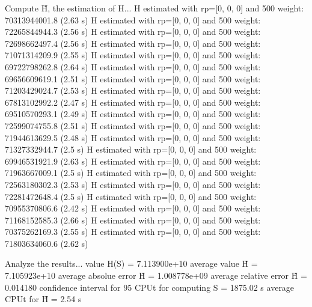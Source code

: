 Compute H̃, the estimation of H...
  H estimated with rp=[0, 0, 0] and 500 weight:  70313944001.8  (2.63 s)
  H estimated with rp=[0, 0, 0] and 500 weight:  72265844944.3  (2.56 s)
  H estimated with rp=[0, 0, 0] and 500 weight:  72698662497.4  (2.56 s)
  H estimated with rp=[0, 0, 0] and 500 weight:  71071314209.9  (2.55 s)
  H estimated with rp=[0, 0, 0] and 500 weight:  69722798262.8  (2.64 s)
  H estimated with rp=[0, 0, 0] and 500 weight:  69656609619.1  (2.51 s)
  H estimated with rp=[0, 0, 0] and 500 weight:  71203429024.7  (2.53 s)
  H estimated with rp=[0, 0, 0] and 500 weight:  67813102992.2  (2.47 s)
  H estimated with rp=[0, 0, 0] and 500 weight:  69510570293.1  (2.49 s)
  H estimated with rp=[0, 0, 0] and 500 weight:  72599074755.8  (2.51 s)
  H estimated with rp=[0, 0, 0] and 500 weight:  71944613629.5  (2.48 s)
  H estimated with rp=[0, 0, 0] and 500 weight:  71327332944.7  (2.5 s)
  H estimated with rp=[0, 0, 0] and 500 weight:  69946531921.9  (2.63 s)
  H estimated with rp=[0, 0, 0] and 500 weight:  71963667009.1  (2.5 s)
  H estimated with rp=[0, 0, 0] and 500 weight:  72563180302.3  (2.53 s)
  H estimated with rp=[0, 0, 0] and 500 weight:  72281472648.4  (2.5 s)
  H estimated with rp=[0, 0, 0] and 500 weight:  70955370806.6  (2.42 s)
  H estimated with rp=[0, 0, 0] and 500 weight:  71168152585.3  (2.66 s)
  H estimated with rp=[0, 0, 0] and 500 weight:  70375262169.3  (2.55 s)
  H estimated with rp=[0, 0, 0] and 500 weight:  71803634060.6  (2.62 s)

Analyze the results...
  value H(S)                  = 7.113900e+10 
  average value H̃             = 7.105923e+10 
  average absolue error H̃     = 1.008778e+09 
  average relative error H̃    = 0.014180 
  confidence interval for 95%
  CPUt for computing S         = 1875.02 s
  average CPUt for H̃           = 2.54 s


